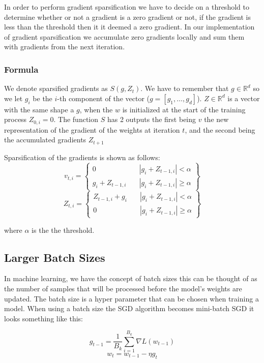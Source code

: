 \documentclass[twocolumn,10pt]{article}
\begin{document}
In order to perform gradient sparsification we have to decide on a threshold to determine whether or not a gradient is a zero gradient or not, if the gradient is less than the threshold then it it deemed a zero gradient. In our implementation of gradient sparsification we accumulate zero gradients locally and sum them with gradients from the next iteration. 

\subsubsection{Formula}
We denote sparsified gradients as $S(g, Z_t)$. We have to remember that $g \in \mathbb{R}^d$ so we let $g_i$ be the $i$-th component of the vector ($g=[g_1,\ldots,g_d]$). $Z \in \mathbb{R}^d$ is a vector with the same shape a $g$, when the $w$ is initialized at the start of the training process $Z_{0,i} = 0$. The function $S$ has 2 outputs the first being $v$ the new representation of the gradient of the weights at iteration $t$, and the second being the accumulated gradients $Z_{t+1}$

Sparsification of the gradients is shown as follows: 
$$
v_{t,i} =
\left\{
	\begin{array}{cc}
		0 & \quad \left| g_i + Z_{t-1,i}\right| < \alpha \\
		g_i + Z_{t-1,i} & \quad \left| g_i + Z_{t-1,i}\right| \geq \alpha
	\end{array}
\right\}
$$
$$
Z_{t,i} =
\left\{
	\begin{array}{cc}
		Z_{t-1,i} + g_i & \quad \left| g_i + Z_{t-1,i}\right| < \alpha \\
		0	& \quad \left| g_i + Z_{t-1,i}\right| \geq \alpha
	\end{array}
\right\}
$$

where $\alpha$ is the the threshold.


\subsection{Larger Batch Sizes}
In machine learning, we have the concept of batch sizes this can be thought of as the number of samples that will be processed before the model's weights are updated. The batch size is a hyper parameter that can be chosen when training a model. When using a batch size the SGD algorithm becomes mini-batch SGD it looks something like this:

$$
g_{t-1} = \frac{1}{B_k} \sum_{i=1}^{B_k} {\nabla} L(w_{t-1})
$$
$$
w_{t} = w_{t-1} - \eta g_{t}
$$ 
\end{document}
